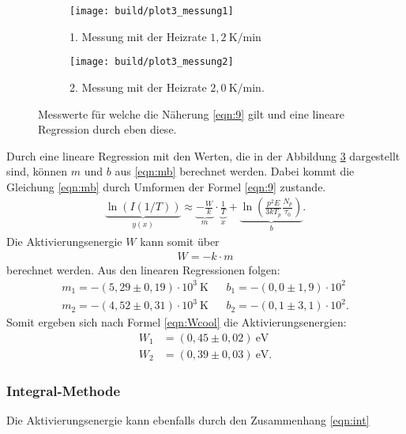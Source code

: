 \begin{figure}
  \centering
  \begin{subfigure}{0.49\textwidth}
    \centering
    \texttt{[image: build/plot3\_messung1]}
    \caption{1. Messung mit der Heizrate $1,2 \ \si{\kelvin\per\minute}$}
    \label{fig:logfit1}
  \end{subfigure}
  \begin{subfigure}{0.49\textwidth}
    \centering
    \texttt{[image: build/plot3\_messung2]}
    \caption{2. Messung mit der Heizrate $2,0 \ \si{\kelvin\per\minute}$.}
    \label{fig:logfit2}
  \end{subfigure}
\caption{Messwerte für welche
die Näherung \ref{eqn:9} gilt und eine lineare Regression durch eben diese.}
\label{fig:logfit}
\end{figure}
\FloatBarrier

Durch eine lineare Regression
mit den Werten, die in der Abbildung \ref{fig:logfit} dargestellt sind, können
$m$ und $b$ aus \eqref{eqn:mb} berechnet werden. Dabei kommt die Gleichung \eqref{eqn:mb}
durch Umformen der Formel \ref{eqn:9} zustande.
\begin{align}
  \underbrace{\ln(I(1/T))}_{y(x)}\approx \underbrace{-\frac{W}{k}}_{m}\cdot \underbrace{\frac1T}_{x}+\underbrace{\ln \left( \frac{p^2E}{3kT_p} \frac{N_p}{\tau_0}\right)}_{b}. \label{eqn:mb}
\end{align}
Die Aktivierungsenergie $W$ kann somit über
\begin{align}
  W=-k\cdot m \label{eqn:Wcool}
\end{align}
berechnet werden.
Aus den linearen Regressionen folgen:
\begin{align*}
  m_1=-(5,29\pm0,19)\cdot10^{3}\ \si{\kelvin}    &  &b_1=-(0,0\pm1,9)\cdot10^{2}\\
  m_2=-(4,52\pm0,31)\cdot10^{3}\ \si{\kelvin}    &  &b_2=-(0,1\pm3,1)\cdot10^{2}.
\end{align*}
Somit ergeben sich nach Formel \eqref{eqn:Wcool} die Aktivierungsenergien:
\begin{align*}
  W_1&=(0,45\pm0,02)\ \si{\electronvolt}\\
  W_2&=(0,39\pm0,03)\ \si{\electronvolt}.
\end{align*}

\subsubsection{Integral-Methode}
\label{sec:integral}
Die Aktivierungsenergie kann ebenfalls durch den Zusammenhang \eqref{eqn:int}

